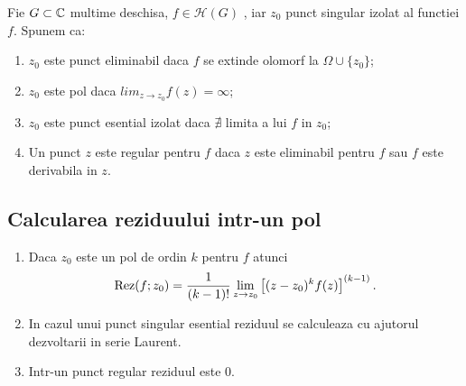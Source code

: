 \begin{definition}
    Fie $G \subset \mathbb{C}$ multime deschisa, $f\in\mathcal{H}(G)$ , iar $z_0$ punct singular
    izolat al functiei $f$. Spunem ca:
    \begin{enumerate}
        \item  $z_0$ este punct eliminabil daca $f$ se extinde olomorf la $\Omega \cup \{z_0\}$;
        \item  $z_0$ este pol daca $lim_{z \to z_0} f(z) = \infty$;
        \item  $z_0$ este punct esential izolat daca $\nexists$ limita a lui $f$ in $z_0$;
        \item Un punct $z$ este regular pentru $f$ daca $z$ este eliminabil pentru $f$
        sau $f$ este derivabila in $z$.
    \end{enumerate}
\end{definition}

\subsection{Calcularea reziduului intr-un pol}
\begin{enumerate}
    \item Daca $z_0$ este un pol de ordin $k$ pentru $f$ atunci
    \[
    \operatorname{Rez}(f;z_0) = \frac{1}{(k-1)!}\lim_{z \to z_0} \left[(z-z_0)^k f(z) \right]^{(k-1)}.
    \]
    \item In cazul unui punct singular esential reziduul se calculeaza cu ajutorul dezvoltarii
    in serie Laurent.
    \item Intr-un punct regular reziduul este 0.
\end{enumerate}
